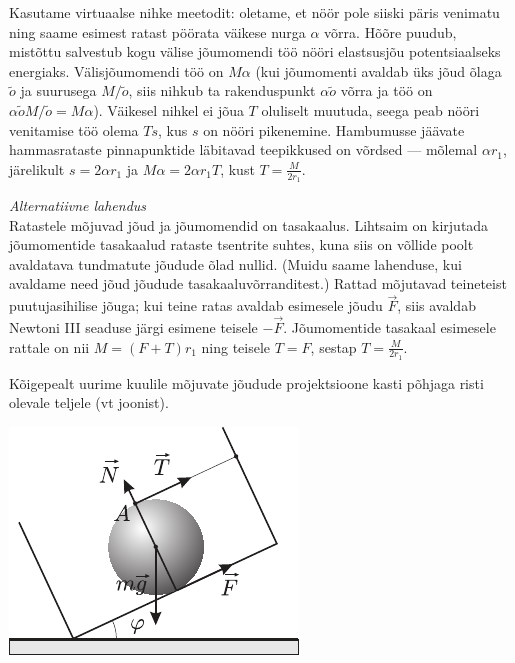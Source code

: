 \documentclass[10pt]{article}
\begin{document}
{%

\solu
Kasutame virtuaalse nihke meetodit: oletame, et nöör pole siiski päris venimatu ning
saame esimest ratast pöörata väikese nurga $\alpha$ võrra. Hõõre puudub,
mistõttu salvestub kogu välise jõumomendi töö nööri elastsusjõu potentsiaalseks
energiaks. Välisjõumomendi töö on $M \alpha$ (kui jõumomenti avaldab üks jõud
õlaga $\tilde o$ ja suurusega $M / \tilde o$, siis nihkub ta rakenduspunkt $\alpha
\tilde o$ võrra ja töö on $\alpha \tilde o M / \tilde o = M \alpha$). Väikesel
nihkel ei jõua $T$ oluliselt muutuda, seega peab nööri venitamise töö olema $T
s$, kus $s$ on nööri pikenemine. Hambumusse jäävate hammasrataste pinnapunktide
läbitavad teepikkused on võrdsed --- mõlemal $\alpha r_1$, järelikult $s = 2
\alpha r_1$ ja $M \alpha = 2 \alpha r_1 T$, kust $T = \frac{M}{2 r_1}$.

\vspace{0.5\baselineskip}
\textit{Alternatiivne lahendus}\\
Ratastele mõjuvad jõud ja jõumomendid on tasakaalus. Lihtsaim on kirjutada
jõumomentide tasakaalud rataste tsentrite suhtes, kuna siis on võllide poolt
avaldatava tundmatute jõudude õlad nullid. (Muidu saame lahenduse, kui avaldame
need jõud jõudude tasakaaluvõrranditest.) Rattad mõjutavad teineteist
puutujasihilise jõuga; kui teine ratas avaldab esimesele jõudu $\vec F$, siis
avaldab Newtoni III seaduse järgi esimene teisele $-\vec F$. Jõumomentide
tasakaal esimesele rattale on nii $M = (F+T) r_1$ ning teisele $T=F$, sestap
$T = \frac{M}{2 r_1}$.
\probend
\bigskip


\solu
Kõigepealt uurime kuulile mõjuvate jõudude projektsioone kasti põhjaga risti olevale teljele (vt joonist).

\begin{center}
	\includegraphics[width=0.5\linewidth]{2006-lahg-07-lah}
\end{center}

}
\end{document}

